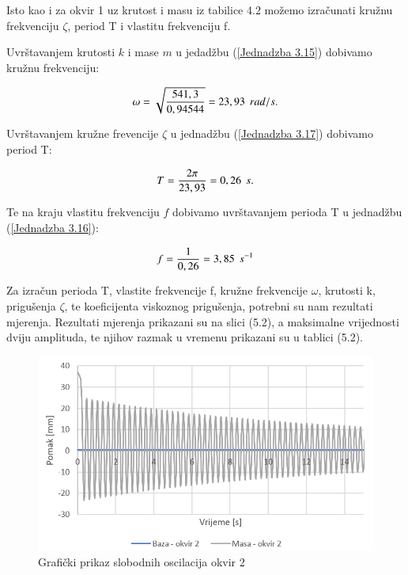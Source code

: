\documentclass[12pt]{book}
\begin{document}
Isto kao i za okvir 1 uz krutost i masu iz tabilice 4.2 možemo izračunati kružnu frekvenciju $\zeta$, period T i vlastitu frekvenciju f.

Uvrštavanjem krutosti $k$ i mase $m$ u jedadžbu (\ref{Jednadzba 3.15}) dobivamo kružnu frekvenciju:

\begin{equation}\label{Jednadzba 5.11}
	\omega = \sqrt{\frac{541,3}{0,94544}} =  23,93 \hspace{0.15cm} rad/s.
\end{equation}

Uvrštavanjem kružne frevencije $\zeta$ u jednadžbu (\ref{Jednadzba 3.17}) dobivamo period T:

\begin{equation}\label{Jednadzba 5.12}
	T = \frac{2\pi}{23,93} = 0,26 \hspace{0.15cm} s.
\end{equation}

Te na kraju vlastitu frekvenciju $f$ dobivamo uvrštavanjem perioda T u jednadžbu (\ref{Jednadzba 3.16}):

\begin{equation}\label{Jednadzba 5.13}
	f = \frac{1}{0,26} = 3,85 \hspace{0.15cm} s^{-1}
\end{equation}

Za izračun perioda T, vlastite frekvencije f, kružne frekvencije $\omega$, krutosti k, prigušenja $\zeta$, te koeficijenta viskoznog prigušenja, potrebni su nam rezultati mjerenja. Rezultati mjerenja prikazani su na slici (5.2), a maksimalne vrijednosti dviju amplituda, te njihov razmak u vremenu prikazani su u tablici (5.2).

\begin{figure}[h]
	\centering
	\includegraphics[width=1\linewidth]{Slike/slobodne_oscilacije_o2}
	\caption{Grafički prikaz slobodnih oscilacija okvir 2}
	\label{fig:slobodneoscilacijeo2}
\end{figure}
\end{document}
